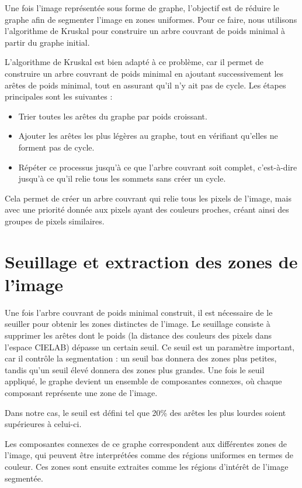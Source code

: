 \documentclass[a4paper,12pt]{report}
\begin{document}
Une fois l'image représentée sous forme de graphe, l'objectif est de réduire le graphe afin de segmenter l'image en zones uniformes. Pour ce faire, nous utilisons l'algorithme de Kruskal pour construire un arbre couvrant de poids minimal à partir du graphe initial.

L'algorithme de Kruskal est bien adapté à ce problème, car il permet de construire un arbre couvrant de poids minimal en ajoutant successivement les arêtes de poids minimal, tout en assurant qu'il n'y ait pas de cycle. Les étapes principales sont les suivantes :

\begin{itemize}
    \item Trier toutes les arêtes du graphe par poids croissant.
    \item Ajouter les arêtes les plus légères au graphe, tout en vérifiant qu'elles ne forment pas de cycle.
    \item Répéter ce processus jusqu'à ce que l'arbre couvrant soit complet, c'est-à-dire jusqu'à ce qu'il relie tous les sommets sans créer un cycle.
\end{itemize}

Cela permet de créer un arbre couvrant qui relie tous les pixels de l'image, mais avec une priorité donnée aux pixels ayant des couleurs proches, créant ainsi des groupes de pixels similaires.

\section{Seuillage et extraction des zones de l'image}

Une fois l'arbre couvrant de poids minimal construit, il est nécessaire de le seuiller pour obtenir les zones distinctes de l'image. Le seuillage consiste à supprimer les arêtes dont le poids (la distance des couleurs des pixels dans l'espace CIELAB) dépasse un certain seuil. Ce seuil est un paramètre important, car il contrôle la segmentation : un seuil bas donnera des zones plus petites, tandis qu'un seuil élevé donnera des zones plus grandes. Une fois le seuil appliqué, le graphe devient un ensemble de composantes connexes, où chaque composant représente une zone de l'image.

Dans notre cas, le seuil est défini tel que 20\% des arêtes les plus lourdes soient supérieures à celui-ci.

Les composantes connexes de ce graphe correspondent aux différentes zones de l'image, qui peuvent être interprétées comme des régions uniformes en termes de couleur. Ces zones sont ensuite extraites comme les régions d'intérêt de l'image segmentée.
\end{document}
